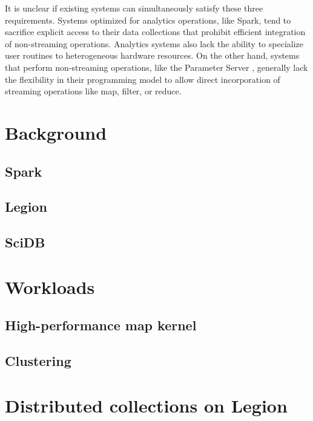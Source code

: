 \documentclass[twocolumn,10pt]{article}
\begin{document}
It is unclear if existing systems can simultaneously satisfy these three
requirements. Systems optimized for analytics operations, like Spark, tend to
sacrifice explicit access to their data collections that prohibit efficient
integration of non-streaming operations. Analytics systems also lack the
ability to specialize user routines to heterogeneous hardware resources. On the
other hand, systems that perform non-streaming operations, like the Parameter
Server \cite{li2014scaling}, generally lack the flexibility in their
programming model to allow direct incorporation of streaming operations like
map, filter, or reduce.

\section{Background}

\subsection{Spark}

\subsection{Legion}

\subsection{SciDB}


\section{Workloads}

\subsection{High-performance map kernel}

\subsection{Clustering}


\section{Distributed collections on Legion}
\end{document}
